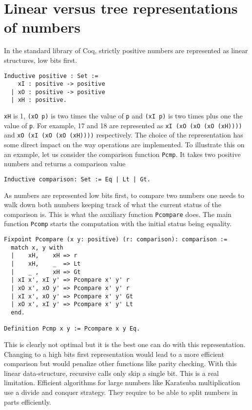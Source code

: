 \section{Linear versus tree representations of numbers\label{ZTree}}

In the standard library of {\sc Coq}, strictly positive numbers are represented as linear structures, low bits first.

\begin{verbatim}
Inductive positive : Set :=
    xI : positive -> positive 
  | xO : positive -> positive 
  | xH : positive.
\end{verbatim}
 {\tt xH} is 1, {\tt (xO p)} is two times the value of {\tt p}
 and {\tt (xI p)} is two times plus one the value of {\tt p}.
For example, 17 and 18 are represented as {\tt xI (xO (xO (xO (xH))))} and
{\tt xO (xI (xO (xO (xH))))} respectively. The choice of the representation
has some direct impact on the way operations are implemented. To illustrate this on an example,
let us consider the comparison function {\tt Pcmp}. It takes two positive numbers
and returns a comparison value
\begin{verbatim}
Inductive comparison: Set := Eq | Lt | Gt.
\end{verbatim}
As numbers are represented low bits first, to compare two numbers 
one needs to walk down both numbers keeping track of what the current status
of the comparison is. This is what the auxiliary function {\tt Pcompare} does. The main 
function {\tt Pcomp} starts the computation with the initial status being equality.
\begin{verbatim}
Fixpoint Pcompare (x y: positive) (r: comparison): comparison :=
  match x, y with
  |    xH,    xH => r
  |    xH,    _  => Lt
  |    _ ,    xH => Gt
  | xI x', xI y' => Pcompare x' y' r
  | xO x', xO y' => Pcompare x' y' r
  | xI x', xO y' => Pcompare x' y' Gt
  | xO x', xI y' => Pcompare x' y' Lt
  end.
  
Definition Pcmp x y := Pcompare x y Eq.
\end{verbatim}
This is clearly not optimal but it is the best one can do with this 
representation. 
Changing to a high bits first representation would lead to a more efficient
comparison but would penalize other functions like parity checking. 
With this linear data-structure, recursive calls only skip a single bit. 
This is a real limitation. Efficient algorithms for large numbers like 
Karatsuba multiplication~\cite{Karat} use a divide and conquer strategy. 
They require to be able to split numbers in parts efficiently. 
